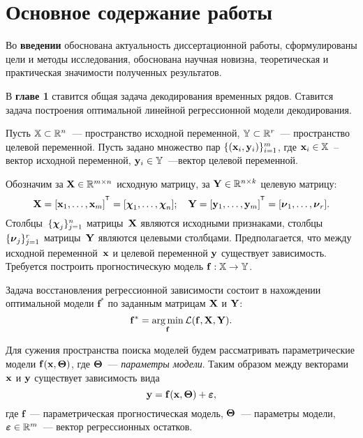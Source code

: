 \documentclass[11pt, a5paper]{dissert}
\begin{document}
\section*{Основное содержание работы}

Во \textbf{введении} обоснована актуальность диссертационной работы, сформулированы цели и методы исследования, обоснована научная новизна, теоретическая и практическая значимости полученных результатов.

В \textbf{главе 1} ставится общая задача декодирования временных рядов.
Ставится задача построения оптимальной линейной регрессионной модели декодирования.

Пусть $\mathbb{X} \subset \mathbb{R}^n$~--- пространство исходной переменной, $\mathbb{Y} \subset \mathbb{R}^r$~--- пространство целевой переменной.
Пусть задано множество пар $\{(\mathbf{x}_i, \mathbf{y}_i)\}_{i=1}^m$, где $\mathbf{x}_i \in \mathbb{X}$~-- вектор исходной переменной, $\mathbf{y}_i \in \mathbb{Y}$~---вектор целевой переменной.

Обозначим за $\mathbf{X} \in \mathbb{R}^{m \times n}$ исходную матрицу, за $\mathbf{Y} \in \mathbb{R}^{n \times k}$ целевую матрицу:
\begin{equation*}
	\bX = [\bx_1, \dots, \bx_m]^{\T} =  [\bchi_1, \dots, \bchi_n]; \quad \bY = [\by_1, \dots, \by_m]^{\T} =  [\bnu_1, \dots, \bnu_r].
\end{equation*}
Столбцы~$\{\boldsymbol{\chi}_j\}_{j=1}^n$ матрицы~$\mathbf{X}$ являются исходными признаками, столбцы~$\{\boldsymbol{\nu}_j\}_{j=1}^r$ матрицы~$\mathbf{Y}$ являются целевыми столбцами.
Предполагается, что между исходной переменной~$\mathbf{x}$ и целевой переменной $\mathbf{y}$ существует зависимость. Требуется построить прогностическую модель $\mathbf{f}: \mathbb{X} \rightarrow \mathbb{Y}$.

Задача восстановления регрессионной зависимости состоит в нахождении оптимальной модели $\mathbf{f}^*$ по заданным матрицам $\mathbf{X}$ и $\mathbf{Y}$:
\begin{equation}
	\mathbf{f}^* = \mathop{\arg \min}\limits_\mathbf{f} \mathcal{L}(\mathbf{f}, \mathbf{X}, \mathbf{Y}).
	\label{ch1:eq:loss_min}
\end{equation}

Для сужения пространства поиска моделей будем рассматривать параметрические модели $\mathbf{f}(\mathbf{x}, \boldsymbol{\Theta})$, где $\boldsymbol{\Theta}$~--- \textit{параметры модели}. 
Таким образом между векторами $\mathbf{x}$ и $\mathbf{y}$ существует зависимость вида
\begin{equation}
	\mathbf{y} = \mathbf{f}(\mathbf{x}, \boldsymbol{\Theta}) + \boldsymbol{\varepsilon},
	\label{ch1:eq:reg_model}
\end{equation}
где $\mathbf{f}$~--- параметрическая прогностическая модель, $\boldsymbol{\Theta}$~--- параметры модели, $\boldsymbol{\varepsilon} \in \mathbb{R}^{m}$~--- вектор регрессионных остатков. 
\end{document}
